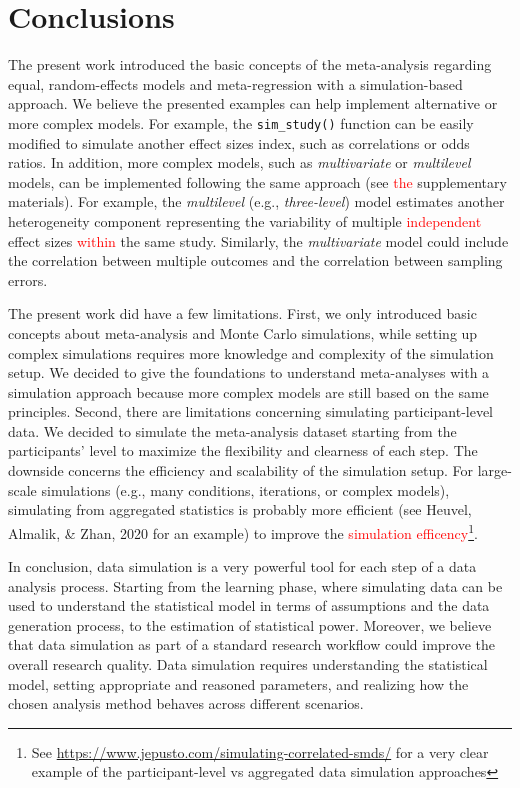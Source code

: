 \documentclass[
  man,floatsintext]{apa6}
\begin{document}
\normalsize

\hypertarget{conclusions}{%
\section{Conclusions}\label{conclusions}}

The present work introduced the basic concepts of the meta-analysis regarding equal, random-effects models and meta-regression with a simulation-based approach. We believe the presented examples can help implement alternative or more complex models. For example, the \texttt{sim\_study()} function can be easily modified to simulate another effect sizes index, \color{red} such as correlations or odds ratios. \color{black} In addition, more complex models, such as \emph{multivariate} or \emph{multilevel} models, can be implemented following the same approach (see \textcolor{red}{the} supplementary materials). For example, the \color{red} \emph{multilevel} (e.g., \emph{three-level}) \color{black} model estimates another heterogeneity component representing the variability of multiple \textcolor{red}{independent} effect sizes \textcolor{red}{within} the same study. Similarly, the \emph{multivariate} model could include the correlation between multiple outcomes and the correlation between sampling errors.

The present work did have a few limitations. First, we only introduced basic concepts about meta-analysis and Monte Carlo simulations, while setting up complex simulations requires more knowledge and complexity of the simulation setup. We decided to give the foundations to understand meta-analyses with a simulation approach because more complex models are still based on the same principles. Second, there are limitations concerning simulating participant-level data. We decided to simulate the meta-analysis dataset starting from the participants' level to maximize the flexibility and clearness of each step. The downside concerns the efficiency and scalability of the simulation setup. For large-scale simulations (e.g., many conditions, iterations, or complex models), simulating from aggregated statistics is probably more efficient (see Heuvel, Almalik, \& Zhan, 2020 for an example) to improve the \textcolor{red}{simulation efficency}\footnote{See \url{https://www.jepusto.com/simulating-correlated-smds/} for a very clear example of the participant-level vs aggregated data simulation approaches}.

In conclusion, data simulation is a very powerful tool for each step of a data analysis process. Starting from the learning phase, where simulating data can be used to understand the statistical model in terms of assumptions and the data generation process, to the estimation of statistical power. Moreover, we believe that data simulation as part of a standard research workflow could improve the overall research quality. Data simulation requires understanding the statistical model, setting appropriate and reasoned parameters, and realizing how the chosen analysis method behaves across different scenarios.
\end{document}
